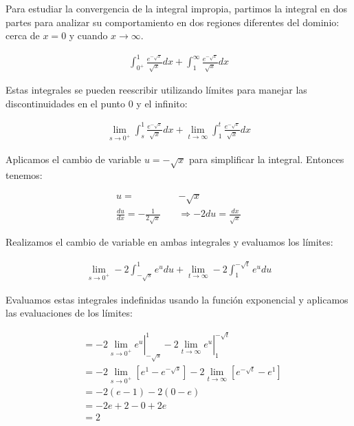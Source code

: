 \documentclass{article}
\begin{document}
    Para estudiar la convergencia de la integral impropia, partimos la integral en dos partes para analizar su comportamiento en dos regiones diferentes del dominio: cerca de \(x = 0\) y cuando \(x \rightarrow \infty\).

    \begin{align*}
    \int_{0^{+}}^{1} \frac{e^{-\sqrt{x}}}{\sqrt{x}} d x+\int_{1}^{\infty} \frac{e^{-\sqrt{x}}}{\sqrt{x}} d x
    \end{align*}

    Estas integrales se pueden reescribir utilizando límites para manejar las discontinuidades en el punto 0 y el infinito:

    \begin{align*}
    \lim_{s \rightarrow 0^{+}} \int_{s}^{1} \frac{e^{-\sqrt{x}}}{\sqrt{x}} d x + \lim_{t \rightarrow \infty} \int_{1}^{t} \frac{e^{-\sqrt{x}}}{\sqrt{x}} d x
    \end{align*}

    Aplicamos el cambio de variable \( u = -\sqrt{x} \) para simplificar la integral. Entonces tenemos:

   $$ \begin{aligned}
      u = & -\sqrt{x} \\
      \frac{d u}{d x} = -\frac{1}{2 \sqrt{x}} \quad &\Rightarrow -2 d u = \frac{d x}{\sqrt{x}}
    \end{aligned}$$

    Realizamos el cambio de variable en ambas integrales y evaluamos los límites:

    \begin{align*}
    \lim_{s \rightarrow 0^{+}} -2 \int_{-\sqrt{s}}^{1} e^{u} d u + \lim_{t \rightarrow \infty} -2 \int_{1}^{-\sqrt{t}} e^{u} d u
    \end{align*}

    Evaluamos estas integrales indefinidas usando la función exponencial y aplicamos las evaluaciones de los límites:

    \begin{align*}
    & = -\left.2 \lim_{s \rightarrow 0^{+}} e^{u} \right|_{-\sqrt{s}}^{1} - \left.2 \lim_{t \rightarrow \infty} e^{u} \right|_{1}^{-\sqrt{t}} \\
    & = -2 \lim_{s \rightarrow 0^{+}} \left[e^{1} - e^{-\sqrt{s}}\right] - 2 \lim_{t \rightarrow \infty} \left[e^{-\sqrt{t}} - e^{1}\right] \\
    & = -2(e - 1) - 2(0 - e) \\
    & = -2e + 2 - 0 + 2e \\
    & = 2
    \end{align*}
\end{document}
